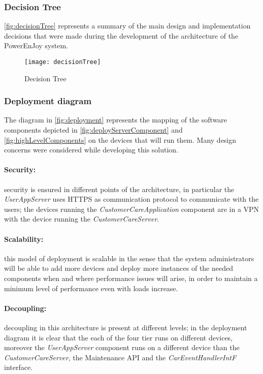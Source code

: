 \subsubsection{Decision Tree}
\autoref{fig:decisionTree} represents a summary of the main design and implementation decisions that were made during the development of the architecture of the PowerEnJoy system.\\

\begin{figure}[h!]
	\centering
	\texttt{[image: decisionTree]}
	\caption{
		\label{fig:decisionTree} 
		Decision Tree
	}
\end{figure}
\clearpage
\subsubsection{Deployment diagram}
The diagram in \autoref{fig:deployment} represents the mapping of the software components depicted in \autoref{fig:deployServerComponent} and \autoref{fig:highLevelComponents} on the devices that will run them. Many design concerns were considered while developing this solution.
\paragraph{Security:}security is ensured in different points of the architecture, in particular the \emph{UserAppServer} uses HTTPS as communication protocol to communicate with the users; the devices running the \emph{CustomerCareApplication} component are in a VPN with the device running the \emph{CustomerCareServer}.
\paragraph{Scalability:}this model of deployment is scalable in the sense that the system administrators will be able to add more devices and deploy more instances of the needed components when and where performance issues will arise, in order to maintain a minimum level of performance even with loads increase.
\paragraph{Decoupling:}decoupling in this architecture is present at different levels; in the deployment diagram it is clear that the each of the four tier runs on different devices, moreover the \emph{UserAppServer} component runs on a different device than the \emph{CustomerCareServer}, the Maintenance API and the \textit{CarEventHandlerIntF} interface.
